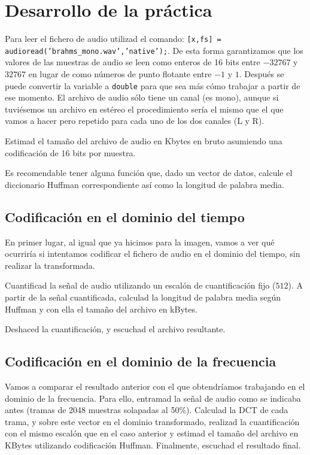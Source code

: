 \documentclass[es,practica]{uah}
\begin{document}
\section{Desarrollo de la práctica}

Para leer el fichero de audio utilizad el comando: \texttt{[x,fs] = audioread('brahms\_mono.wav','native');}. De esta forma garantizamos que los valores de las muestras de audio se leen como enteros de 16 bits entre $-32767$ y $32767$ en lugar de como números de punto flotante entre $-1$ y $1$. Después se puede convertir la variable a \texttt{double} para que sea más cómo trabajar a partir de ese momento. El archivo de audio sólo tiene un canal (es mono), aunque si tuviésemos un archivo en estéreo el procedimiento sería el mismo que el que vamos a hacer pero repetido para cada uno de los dos canales (L y R).

Estimad el tamaño del archivo de audio en Kbytes en bruto asumiendo una codificación de 16 bits por muestra. 

Es recomendable tener alguna función que, dado un vector de datos, calcule el diccionario Huffman correspondiente así como la longitud de palabra media. 



\subsection{Codificación en el dominio del tiempo}

En primer lugar, al igual que ya hicimos para la imagen, vamos a ver qué ocurriría si intentamos codificar el fichero de audio en el dominio del tiempo, sin realizar la transformada.

Cuantificad la señal de audio utilizando un escalón de cuantificación fijo ($512$). A partir de la señal cuantificada, calculad la longitud de palabra media según Huffman y con ella el tamaño del archivo en kBytes.

Deshaced la cuantificación, y escuchad el archivo resultante. 


\subsection{Codificación en el dominio de la frecuencia}

Vamos a comparar el resultado anterior con el que obtendríamos trabajando en el dominio de la frecuencia. Para ello, entramad la señal de audio como se indicaba antes (tramas de 2048 muestras solapadas al 50\%). Calculad la DCT de cada trama, y sobre este vector en el dominio transformado, realizad la cuantificación con el mismo escalón que en el caso anterior y estimad el tamaño del archivo en KBytes utilizando codificación Huffman. Finalmente, escuchad el resultado final.
\end{document}
